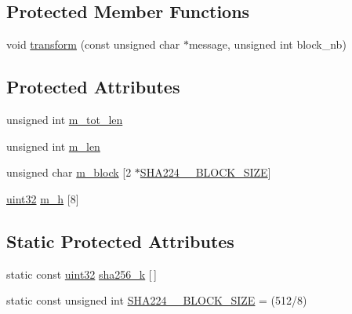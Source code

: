 \subsection*{Protected Member Functions}
\begin{DoxyCompactItemize}
\item 
void \hyperlink{classclang_1_1tidy_1_1pagesjaunes_1_1test_1_1_backup_file_1_1_s_h_a256_ae64c6bc94653842c2fe85c19a640c5b8}{transform} (const unsigned char $\ast$message, unsigned int block\+\_\+nb)
\end{DoxyCompactItemize}
\subsection*{Protected Attributes}
\begin{DoxyCompactItemize}
\item 
unsigned int \hyperlink{classclang_1_1tidy_1_1pagesjaunes_1_1test_1_1_backup_file_1_1_s_h_a256_a18505637695954b86e818921a8e9b107}{m\+\_\+tot\+\_\+len}
\item 
unsigned int \hyperlink{classclang_1_1tidy_1_1pagesjaunes_1_1test_1_1_backup_file_1_1_s_h_a256_a0ddad3973413081bc45f017b3864521f}{m\+\_\+len}
\item 
unsigned char \hyperlink{classclang_1_1tidy_1_1pagesjaunes_1_1test_1_1_backup_file_1_1_s_h_a256_a76ddd0a8f01408ba303f29aa6a10dac8}{m\+\_\+block} \mbox{[}2 $\ast$\hyperlink{classclang_1_1tidy_1_1pagesjaunes_1_1test_1_1_backup_file_1_1_s_h_a256_a7d5363944f4230f6c0adb86b41c1fb78}{S\+H\+A224\+\_\+\_\+\+B\+L\+O\+C\+K\+\_\+\+S\+I\+ZE}\mbox{]}
\item 
\hyperlink{classclang_1_1tidy_1_1pagesjaunes_1_1test_1_1_backup_file_1_1_s_h_a256_ad36a1d5021aca69fa0d2de1f98c1ebe6}{uint32} \hyperlink{classclang_1_1tidy_1_1pagesjaunes_1_1test_1_1_backup_file_1_1_s_h_a256_a59d7ee4f3dadd9ee19e56416b5fb2566}{m\+\_\+h} \mbox{[}8\mbox{]}
\end{DoxyCompactItemize}
\subsection*{Static Protected Attributes}
\begin{DoxyCompactItemize}
\item 
static const \hyperlink{classclang_1_1tidy_1_1pagesjaunes_1_1test_1_1_backup_file_1_1_s_h_a256_ad36a1d5021aca69fa0d2de1f98c1ebe6}{uint32} \hyperlink{classclang_1_1tidy_1_1pagesjaunes_1_1test_1_1_backup_file_1_1_s_h_a256_a8afc4f38ebf6dc7611b1f91fa7732518}{sha256\+\_\+k} \mbox{[}$\,$\mbox{]}
\item 
static const unsigned int \hyperlink{classclang_1_1tidy_1_1pagesjaunes_1_1test_1_1_backup_file_1_1_s_h_a256_a7d5363944f4230f6c0adb86b41c1fb78}{S\+H\+A224\+\_\+\_\+\+B\+L\+O\+C\+K\+\_\+\+S\+I\+ZE} = (512/8)
\end{DoxyCompactItemize}


